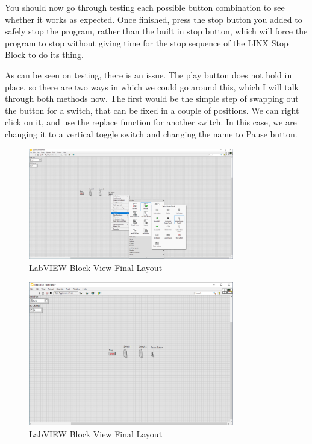 \documentclass[a4paper,11pt]{report}
\begin{document}
You should now go through testing each possible button combination to see whether it works as expected. Once finished, press the stop button you added to safely stop the program, rather than the built in stop button, which will force the program to stop without giving time for the stop sequence of the LINX Stop Block to do its thing.

As can be seen on testing, there is an issue. The play button does not hold in place, so there are two ways in which we could go around this, which I will talk through both methods now. The first would be the simple step of swapping out the button for a switch, that can be fixed in a couple of positions. We can right click on it, and use the replace function for another switch. In this case, we are changing it to a vertical toggle switch and changing the name to Pause button.

\begin{figure}[H]
\centering
\includegraphics[width=0.8\textwidth]{screenshots/labview31}
\caption{LabVIEW Block View Final Layout}
\end{figure}

\begin{figure}[H]
\centering
\includegraphics[width=0.8\textwidth]{screenshots/labview32}
\caption{LabVIEW Block View Final Layout}
\end{figure}
\end{document}
